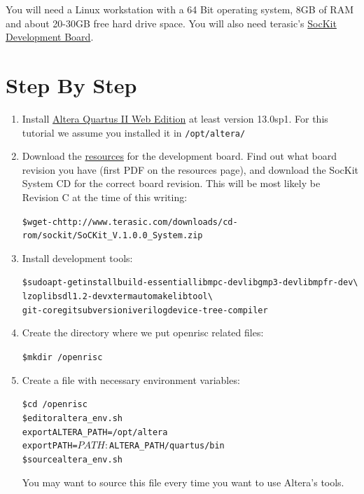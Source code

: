 \documentclass[twoside]{article}
\begin{document}
You will need a Linux workstation with a 64 Bit operating system, 8GB
of RAM and about 20-30GB free hard drive space. You will also need
terasic's
\href{http://www.terasic.com.tw/cgi-bin/page/archive.pl?Language=English\&No=816}{SocKit
  Development Board}.


\section{Step By Step}
\begin{enumerate}
\item Install \href{http://dl.altera.com/?edition=web}{Altera Quartus
    II Web Edition} at least version 13.0sp1. For this tutorial we assume
  you installed it in \texttt{/opt/altera/}

\item Download the
  \href{http://www.terasic.com.tw/cgi-bin/page/archive.pl?Language=English\&CategoryNo=165\&No=816\&PartNo=4}{resources}
  for the development board. Find out what board revision you have
  (first PDF on the resources page), and download the SocKit System CD
  for the correct board revision. This will be most likely be Revision
  C at the time of this writing:
  \begin{alltt}
\$ wget -c http://www.terasic.com/downloads/cd-rom/sockit/SoCKit\_V.1.0.0\_System.zip
  \end{alltt}

\item Install development tools:
  \begin{alltt}
\$ sudo apt-get install build-essential libmpc-dev libgmp3-dev libmpfr-dev  \textbackslash
                       lzop libsdl1.2-dev xterm automake libtool \textbackslash
                       git-core git subversion iverilog device-tree-compiler
  \end{alltt}

\item Create the directory where we put openrisc related files:
  \begin{alltt}
\$ mkdir ~/openrisc
  \end{alltt}

\item Create a file with necessary environment variables:
  \begin{alltt}
\$ cd ~/openrisc
\$ editor altera_env.sh
\hrulefill
export ALTERA_PATH=/opt/altera
export PATH=$PATH:$ALTERA_PATH/quartus/bin
\hrulefill
\$ source altera_env.sh
  \end{alltt}
  You may want to source this file every time you want to use Altera's
  tools.


\end{enumerate}
\end{document}
